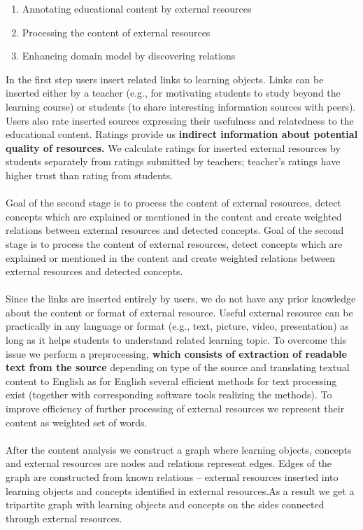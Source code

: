 \documentclass{llncs}
\begin{document}
\begin{enumerate}
\item Annotating educational content by external resources  
\item Processing the content of external resources 
\item Enhancing domain model by discovering relations
\end{enumerate} 
In the first step users insert related links to learning objects. Links can be inserted either by a teacher (e.g., for motivating students to study beyond the learning course) or students (to share interesting information sources with peers). Users also rate inserted sources expressing their usefulness and relatedness to the educational content. Ratings provide us \textbf {indirect information about potential quality of resources.} We calculate ratings for inserted external resources by students separately from ratings submitted by teachers; teacher’s ratings have higher trust than rating from students.\\
\\
Goal of the second stage is to process the content of external resources, detect concepts which are explained or mentioned in the content and create weighted relations between external resources and detected concepts.  Goal of the second stage is to process the content of external resources, detect concepts which are explained or mentioned in the content and create weighted relations between external resources and detected concepts.\\
\\
Since the links are inserted entirely by users, we do not have any prior knowledge about the content or format of external resource. Useful external resource can be practically in any language or format (e.g., text, picture, video, presentation) as long as it helps students to understand related learning topic. To overcome this issue we perform a preprocessing, \textbf {which consists of extraction of readable text from the source} depending on type of the source and translating textual content to English as for English several efficient methods for text processing exist (together with corresponding software tools realizing the methods). To improve efficiency of further processing of external resources we represent their content as weighted set of words.\\
\\
After the content analysis we construct a graph where learning objects, concepts and external resources are nodes and relations represent edges. Edges of the graph are constructed from known relations – external resources inserted into learning objects and concepts identified in external resources.As a result we get a tripartite graph with learning objects and concepts on the sides connected through external resources.\\
\end{document}
